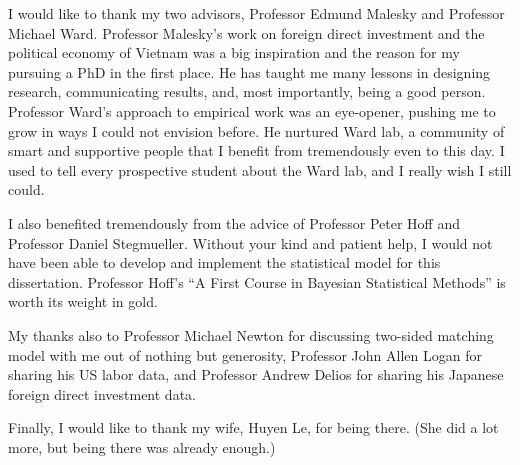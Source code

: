 \acknowledgements

I would like to thank my two advisors, Professor Edmund Malesky and Professor Michael Ward. Professor Malesky's work on foreign direct investment and the political economy of Vietnam was a big inspiration and the reason for my pursuing a PhD in the first place. He has taught me many lessons in designing research, communicating results, and, most importantly, being a good person. Professor Ward's approach to empirical work was an eye-opener, pushing me to grow in ways I could not envision before. He nurtured Ward lab, a community of smart and supportive people that I benefit from tremendously even to this day. I used to tell every prospective student about the Ward lab, and I really wish I still could.  

I also benefited tremendously from the advice of Professor Peter Hoff and Professor Daniel Stegmueller. Without your kind and patient help, I would not have been able to develop and implement the statistical model for this dissertation. Professor Hoff's ``A First Course in Bayesian Statistical Methods'' is worth its weight in gold.

My thanks also to Professor Michael Newton for discussing two-sided matching model with me out of nothing but generosity, Professor John Allen Logan for sharing his US labor data, and Professor Andrew Delios for sharing his Japanese foreign direct investment data.

Finally, I would like to thank my wife, Huyen Le, for being there. (She did a lot more, but being there was already enough.)

